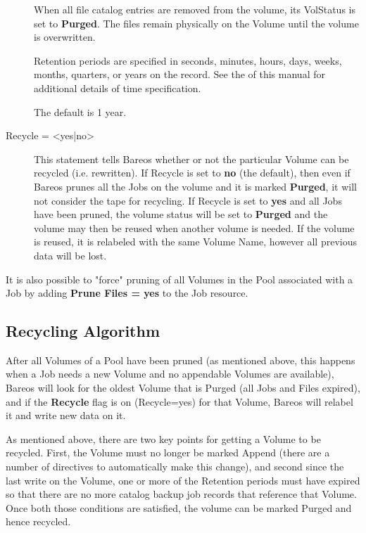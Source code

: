 \begin{description}
   When all file catalog entries are removed from the volume,  its VolStatus is
   set to {\bf Purged}. The files remain physically  on the Volume until the
   volume is overwritten.

   Retention periods are specified in seconds,  minutes, hours, days, weeks,
   months,  quarters, or years on the record. See the
    of this  manual for
   additional details of time specification.

The default is 1 year.

\item [Recycle = {\textless}yes|no{\textgreater}]
   This statement tells Bareos whether or not the particular Volume can be
   recycled (i.e.  rewritten).  If Recycle is set to {\bf no} (the
   default), then even if Bareos prunes all the Jobs on the volume and it
   is marked {\bf Purged}, it will not consider the tape for recycling.  If
   Recycle is set to {\bf yes} and all Jobs have been pruned, the volume
   status will be set to {\bf Purged} and the volume may then be reused
   when another volume is needed.  If the volume is reused, it is relabeled
   with the same Volume Name, however all previous data will be lost.
   \end{description}

   It is also possible to "force" pruning of all Volumes in the Pool
   associated with a Job by adding {\bf Prune Files = yes} to the Job resource.

\subsection{Recycling Algorithm}
\label{RecyclingAlgorithm}
\label{Recycling}


After all Volumes of a Pool have been pruned (as mentioned above, this happens
when a Job needs a new Volume and no appendable Volumes are available), Bareos
will look for the oldest Volume that is Purged (all Jobs and Files expired),
and if the {\bf Recycle} flag is on (Recycle=yes) for that Volume, Bareos will
relabel it and write new data on it.

As mentioned above, there are two key points for getting a Volume
to be recycled. First, the Volume must no longer be marked Append (there
are a number of directives to automatically make this change), and second
since the last write on the Volume, one or more of the Retention periods
must have expired so that there are no more catalog backup job records
that reference that Volume.  Once both those conditions are satisfied,
the volume can be marked Purged and hence recycled.

